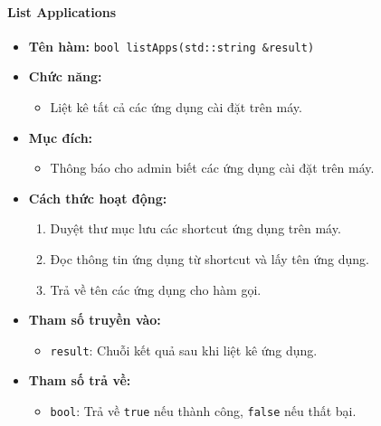 \paragraph{List Applications}
\begin{itemize}
    \item \textbf{Tên hàm:} \texttt{bool listApps(std::string \&result)}
    \item \textbf{Chức năng:}
    \begin{itemize}
        \item Liệt kê tất cả các ứng dụng cài đặt trên máy.
    \end{itemize}
    \item \textbf{Mục đích:}
    \begin{itemize}
        \item Thông báo cho admin biết các ứng dụng cài đặt trên máy.
    \end{itemize}
    \item \textbf{Cách thức hoạt động:}
    \begin{enumerate}
        \item Duyệt thư mục lưu các shortcut ứng dụng trên máy.
        \item Đọc thông tin ứng dụng từ shortcut và lấy tên ứng dụng.
        \item Trả về tên các ứng dụng cho hàm gọi.
    \end{enumerate}
    \item \textbf{Tham số truyền vào:}
    \begin{itemize}
        \item \texttt{result}: Chuỗi kết quả sau khi liệt kê ứng dụng.
    \end{itemize}
    \item \textbf{Tham số trả về:}
    \begin{itemize}
        \item \texttt{bool}: Trả về \texttt{true} nếu thành công, \texttt{false} nếu thất bại.
    \end{itemize}
\end{itemize}


